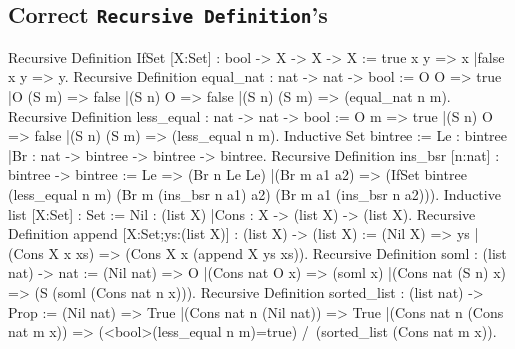 \subsection*{Correct {\tt Recursive Definition}'s}
\begin{coq_example*}
Recursive Definition IfSet [X:Set] : bool -> X -> X -> X :=
  true x y => x
 |false x y => y.
Recursive Definition equal_nat : nat -> nat -> bool :=
  O O => true
 |O (S m) => false
 |(S n) O => false
 |(S n) (S m) => (equal_nat n m).
Recursive Definition less_equal : nat -> nat -> bool :=
  O m => true
 |(S n) O => false
 |(S n) (S m) => (less_equal n m).
Inductive Set bintree :=
  Le : bintree
 |Br : nat -> bintree -> bintree -> bintree.
Recursive Definition ins_bsr [n:nat] : bintree -> bintree :=
  Le => (Br n Le Le)
 |(Br m a1 a2)
  => (IfSet bintree (less_equal n m) (Br m (ins_bsr n a1) a2)
         (Br m a1 (ins_bsr n a2))).
Inductive list [X:Set] : Set :=
  Nil : (list X)
 |Cons : X -> (list X) -> (list X).
Recursive Definition append [X:Set;ys:(list X)] : (list X) -> (list X) :=
  (Nil X) => ys
 |(Cons X x xs) => (Cons X x (append X ys xs)).
Recursive Definition soml : (list nat) -> nat :=
  (Nil nat) => O
 |(Cons nat O x) => (soml x)
 |(Cons nat (S n) x) => (S (soml (Cons nat n x))).
Recursive Definition sorted_list : (list nat) -> Prop :=
  (Nil nat) => True
 |(Cons nat n (Nil nat)) => True
|(Cons nat n (Cons nat m x)) 
  => (<bool>(less_equal n m)=true) /\ (sorted_list (Cons nat m x)).
\end{coq_example*}

